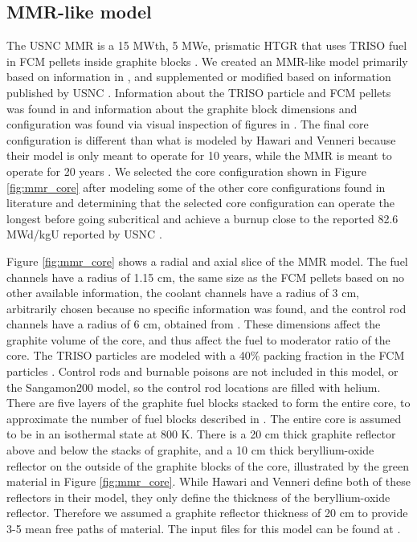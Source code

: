 \subsection{MMR-like model}
The \gls{USNC} \gls{MMR} is a 15 MWth, 5 MWe, prismatic \gls{HTGR} that 
uses \gls{TRISO} fuel in \acrfull{FCM} pellets inside graphite blocks 
\cite{noauthor_usnc_2021}.
We created an \gls{MMR}-like model primarily based on information in 
\cite{hawari_development_2018}, and supplemented or modified based on 
information published by \gls{USNC} \cite{noauthor_usnc_2021}. 
Information about the \gls{TRISO} 
particle and \gls{FCM} pellets was found in \cite{noauthor_usnc_2021}
and information about the graphite block dimensions and configuration 
was found via visual inspection of figures in \cite{venneri_micro_2019}. 
The final core configuration 
is different than what is modeled by Hawari and Venneri \cite{hawari_development_2018} 
because their model is only meant to operate 
for 10 years, while the \gls{MMR} is meant to operate for 20 years 
\cite{noauthor_usnc_2021}. We selected the core configuration shown in 
Figure \ref{fig:mmr_core} after modeling some of the other core 
configurations found in literature \cite{mitchell_usnc_2020,hawari_development_2018}
and determining that the selected core configuration  
can operate the longest before going subcritical and 
achieve a burnup close to the reported 82.6 MWd/kgU reported by 
\gls{USNC} \cite{noauthor_usnc_2021}. 

Figure \ref{fig:mmr_core} shows a radial and axial slice of the 
\gls{MMR} model. The fuel channels have a radius of 1.15 cm, the same
size as the \gls{FCM} pellets based on no other available information, 
the coolant channels have a radius of 
3 cm, arbitrarily chosen because no specific information was found, 
and the control rod channels have a radius of 6 cm, obtained from 
\cite{hawari_development_2018}. These dimensions affect the graphite volume 
of the core, and thus affect the fuel to moderator ratio of the core. 
The \gls{TRISO} particles are modeled with a 40\% packing fraction in 
the \gls{FCM} particles \cite{powers_fully_2014}.
Control rods and burnable poisons are not included in this model, or 
the Sangamon200 model, so the control rod locations are filled with helium.
There are five layers of the graphite fuel blocks 
stacked to form the entire core, to approximate the number of 
fuel blocks described in \cite{noauthor_usnc_2021}. The entire core 
is assumed to be in an isothermal state at 800 K. There is a 20 cm 
thick graphite reflector above and below the stacks of graphite, 
and a 10 cm thick beryllium-oxide reflector on the outside of the 
graphite blocks of the core, illustrated by the green material in 
Figure \ref{fig:mmr_core}. While Hawari and Venneri \cite{hawari_development_2018}
define both of these reflectors in their model, they only 
define the thickness of the beryllium-oxide reflector. Therefore we 
assumed a graphite reflector thickness of 20 cm to provide 3-5 mean 
free paths of material. The input files for this model can be found at 
\cite{bachmann_mmr-like_2023}.

